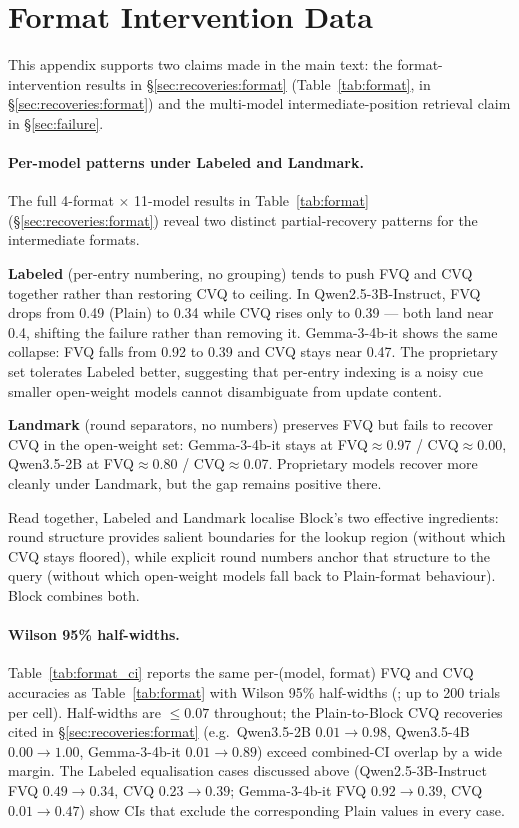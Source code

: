 \documentclass[11pt]{article}
\begin{document}
\section{Format Intervention Data}
\label{app:formats}

This appendix supports two claims made in the main text:
the format-intervention results in \S\ref{sec:recoveries:format}
(Table~\ref{tab:format}, in
\S\ref{sec:recoveries:format}) and the multi-model
intermediate-position retrieval claim in \S\ref{sec:failure}.

\paragraph{Per-model patterns under Labeled and Landmark.}
The full 4-format $\times$ 11-model results in
Table~\ref{tab:format} (\S\ref{sec:recoveries:format}) reveal two
distinct partial-recovery patterns for the intermediate formats.

\textbf{Labeled} (per-entry numbering, no grouping) tends to push
FVQ and CVQ together rather than restoring CVQ to ceiling. In
Qwen2.5-3B-Instruct, FVQ drops from 0.49 (Plain) to 0.34 while CVQ
rises only to 0.39 --- both land near 0.4, shifting the failure
rather than removing it. Gemma-3-4b-it shows the same collapse:
FVQ falls from 0.92 to 0.39 and CVQ stays near 0.47. The
proprietary set tolerates Labeled better, suggesting that
per-entry indexing is a noisy cue smaller open-weight models cannot
disambiguate from update content.

\textbf{Landmark} (round separators, no numbers) preserves FVQ but
fails to recover CVQ in the open-weight set: Gemma-3-4b-it stays at
FVQ$\approx$0.97 / CVQ$\approx$0.00, Qwen3.5-2B at FVQ$\approx$0.80
/ CVQ$\approx$0.07. Proprietary models recover more cleanly under
Landmark, but the gap remains positive there.

Read together, Labeled and Landmark localise Block's two effective
ingredients: round structure provides salient boundaries for the
lookup region (without which CVQ stays floored), while explicit
round numbers anchor that structure to the query (without which
open-weight models fall back to Plain-format behaviour). Block
combines both.

\paragraph{Wilson 95\% half-widths.}
Table~\ref{tab:format_ci} reports the same per-(model, format) FVQ
and CVQ accuracies as Table~\ref{tab:format} with Wilson 95\%
half-widths (\citealp{wilson1927}; up to 200 trials per cell).
Half-widths are $\leq 0.07$ throughout; the Plain-to-Block CVQ
recoveries cited in \S\ref{sec:recoveries:format} (e.g.\ Qwen3.5-2B
$0.01 \to 0.98$, Qwen3.5-4B $0.00 \to 1.00$, Gemma-3-4b-it
$0.01 \to 0.89$) exceed combined-CI overlap by a wide margin. The
Labeled equalisation cases discussed above
(Qwen2.5-3B-Instruct FVQ $0.49 \to 0.34$, CVQ $0.23 \to 0.39$;
Gemma-3-4b-it FVQ $0.92 \to 0.39$, CVQ $0.01 \to 0.47$) show CIs
that exclude the corresponding Plain values in every case.
\end{document}
